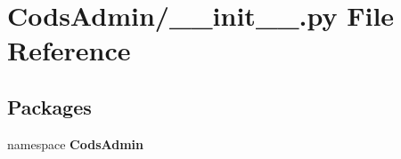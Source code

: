 \section{\-Cods\-Admin/\-\_\-\-\_\-init\-\_\-\-\_\-.py \-File \-Reference}
\label{_cods_admin_2____init_____8py}
\subsection*{\-Packages}
\begin{DoxyCompactItemize}
\item 
namespace {\bf \-Cods\-Admin}
\end{DoxyCompactItemize}
